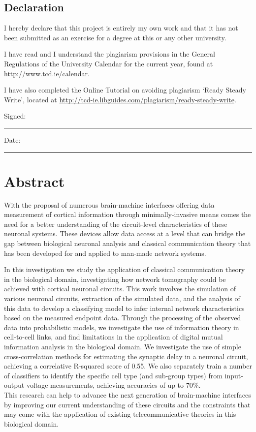 \documentclass[a4paper,oneside,12pt]{book}
\title{\thesistitle}
\author{\authorname}
\begin{document}

\section*{\Huge{Declaration}}
\vspace{1cm}
I hereby declare that this project is entirely my own work and that it has not been submitted as an exercise for a degree at this or any other university.

\vspace{1cm}
I have read and I understand the plagiarism provisions in the General Regulations of the University Calendar for the current year, found at \url{http://www.tcd.ie/calendar}.
\vspace{1cm}

I have also completed the Online Tutorial on avoiding plagiarism `Ready Steady Write', located at
\url{http://tcd-ie.libguides.com/plagiarism/ready-steady-write}.
\vspace{3cm}

Signed:~\rule{5cm}{0.3pt}\hfill Date:~\rule{5cm}{0.3pt}

\chapter*{Abstract}

With the proposal of numerous brain-machine interfaces offering data measurement
of cortical information through minimally-invasive means comes the need for a better
understanding of the circuit-level characteristics of these neuronal systems. These
devices allow data access at a level that can bridge the gap between biological
neuronal analysis and classical communication theory that has been developed for
and applied to man-made network systems.\\
\par
In this investigation we study the application of classical communication theory  in the
biological domain, investigating how network tomography could be
achieved with cortical neuronal circuits. This work involves the simulation of
various neuronal circuits, extraction of the simulated data, and the analysis of this data to develop a
classifying model to infer internal network characteristics based on the measured
endpoint data. Through the processing of the observed data into probabilistic models, we investigate
the use of information theory in cell-to-cell links, and find limitations in the application of
digital mutual information analysis in the biological domain. We investigate the use of simple cross-correlation methods for estimating the synaptic delay in a neuronal circuit, achieving a correlative R-squared score of 0.55.
We also separately train a number of classifiers to identify
the specific cell type (and sub-group types) from input-output voltage measurements, achieving accuracies of up to 70\%.\\
This research can help to advance the next generation of brain-machine interfaces by improving our current understanding of these circuits and the constraints that may come with the application of existing telecommunicative theories in this biological domain.
\end{document}
